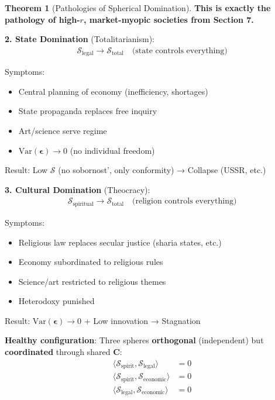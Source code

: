 \documentclass[11pt,a4paper]{article}
\theoremstyle{definition}
\newtheorem{theorem}{Theorem}[section]
\theoremstyle{remark}
\begin{document}
\begin{enumerate}
\begin{theorem}[Pathologies of Spherical Domination]
\textbf{This is exactly the pathology of high-\(r\), market-myopic societies from Section 7.}

\textbf{2. State Domination} (Totalitarianism):
\begin{align}
\mathcal{S}_{\text{legal}} \to \mathcal{S}_{\text{total}} \quad \text{(state controls everything)}
\end{align}

Symptoms:
\begin{itemize}
    \item Central planning of economy (inefficiency, shortages)
    \item State propaganda replaces free inquiry
    \item Art/science serve regime
    \item \(\text{Var}(\boldsymbol{\epsilon}) \to 0\) (no individual freedom)
\end{itemize}

Result: Low \(\mathcal{S}\) (no sobornost', only conformity) → Collapse (USSR, etc.)

\textbf{3. Cultural Domination} (Theocracy):
\begin{align}
\mathcal{S}_{\text{spiritual}} \to \mathcal{S}_{\text{total}} \quad \text{(religion controls everything)}
\end{align}

Symptoms:
\begin{itemize}
    \item Religious law replaces secular justice (sharia states, etc.)
    \item Economy subordinated to religious rules
    \item Science/art restricted to religious themes
    \item Heterodoxy punished
\end{itemize}

Result: \(\text{Var}(\boldsymbol{\epsilon}) \to 0\) + Low innovation → Stagnation

\textbf{Healthy configuration}: Three spheres \textbf{orthogonal} (independent) but \textbf{coordinated} through shared \(\mathbf{C}\):
\begin{align}
\langle \mathcal{S}_{\text{spirit}}, \mathcal{S}_{\text{legal}} \rangle &= 0 \\
\langle \mathcal{S}_{\text{spirit}}, \mathcal{S}_{\text{economic}} \rangle &= 0 \\
\langle \mathcal{S}_{\text{legal}}, \mathcal{S}_{\text{economic}} \rangle &= 0
\end{align}


\end{theorem}
\end{enumerate}
\end{document}
